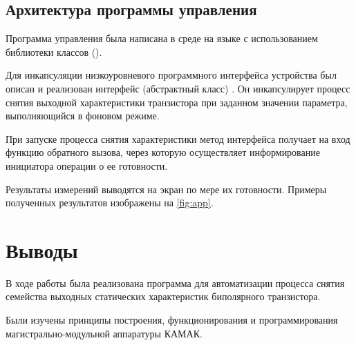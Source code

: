 \subsection{Архитектура программы управления}

Программа управления была написана в среде  на языке  с использованием библиотеки классов  ().

Для инкапсуляции низкоуровневого программного интерфейса устройства был описан и реализован интерфейс (абстрактный класс) . Он инкапсулирует процесс снятия выходной характеристики транзистора при заданном значении параметра, выполняющийся в фоновом режиме.

При запуске процесса снятия характеристики метод интерфейса получает на вход функцию обратного вызова, через которую осуществляет информирование инициатора операции о ее готовности.

Результаты измерений выводятся на экран по мере их готовности. Примеры полученных результатов изображены на \autoref{fig:app}.

\section{Выводы}

В ходе работы была реализована программа для автоматизации процесса снятия семейства выходных статических характеристик биполярного транзистора.

Были изучены принципы построения, функционирования и программирования магистрально-модульной аппаратуры КАМАК.
